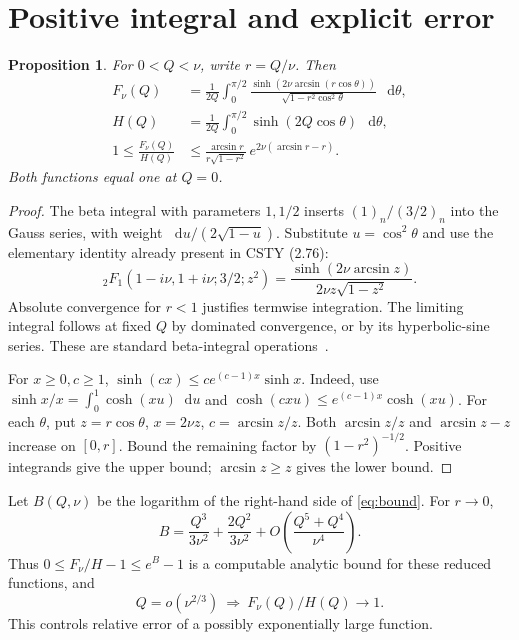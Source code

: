 \documentclass[11pt,a4paper]{article}
\newtheorem{proposition}{Proposition}
\newcommand{\dd}{\mathop{}\!\mathrm d}
\begin{document}
\section{Positive integral and explicit error}
\begin{proposition}
For \(0<Q<\nu\), write \(r=Q/\nu\). Then
\begin{align}
 F_\nu(Q)&=\frac1{2Q}\int_0^{\pi/2}
 \frac{\sinh(2\nu\arcsin(r\cos\theta))}
 {\sqrt{1-r^2\cos^2\theta}}\,\dd\theta, \label{eq:int}\\
 H(Q)&=\frac1{2Q}\int_0^{\pi/2}\sinh(2Q\cos\theta)\,\dd\theta,\\
 1\le\frac{F_\nu(Q)}{H(Q)}
 &\le \frac{\arcsin r}{r\sqrt{1-r^2}}\,
 e^{2\nu(\arcsin r-r)}. \label{eq:bound}
\end{align}
Both functions equal one at \(Q=0\).
\end{proposition}
\begin{proof}
The beta integral with parameters \(1,1/2\) inserts
\((1)_n/(3/2)_n\) into the Gauss series, with weight
\(\dd u/(2\sqrt{1-u})\). Substitute \(u=\cos^2\theta\) and use the
elementary identity already present in CSTY (2.76):
\[
 {}_2F_1(1-i\nu,1+i\nu;3/2;z^2)
 =\frac{\sinh(2\nu\arcsin z)}{2\nu z\sqrt{1-z^2}}.
\]
Absolute convergence for \(r<1\) justifies termwise integration.
The limiting integral follows at fixed \(Q\) by dominated convergence,
or by its hyperbolic-sine series. These are standard beta-integral
operations~\cite{DLMF}.

For \(x\ge0,c\ge1\), \(\sinh(cx)\le c e^{(c-1)x}\sinh x\).
Indeed, use \(\sinh x/x=\int_0^1\cosh(xu)\dd u\) and
\(\cosh(cxu)\le e^{(c-1)x}\cosh(xu)\).
For each \(\theta\), put \(z=r\cos\theta\), \(x=2\nu z\),
\(c=\arcsin z/z\). Both \(\arcsin z/z\) and \(\arcsin z-z\)
increase on \([0,r]\). Bound the remaining factor by
\((1-r^2)^{-1/2}\). Positive integrands give the upper bound;
\(\arcsin z\ge z\) gives the lower bound.
\end{proof}
Let \(B(Q,\nu)\) be the logarithm of the right-hand side of
\eqref{eq:bound}. For \(r\to0\),
\begin{equation}
 B=\frac{Q^3}{3\nu^2}+\frac{2Q^2}{3\nu^2}
   +O\left(\frac{Q^5+Q^4}{\nu^4}\right).
\end{equation}
Thus \(0\le F_\nu/H-1\le e^B-1\) is a computable analytic bound
for these reduced functions, and
\begin{equation}
 Q=o(\nu^{2/3})\ \Longrightarrow\ F_\nu(Q)/H(Q)\to1.
 \label{eq:window}
\end{equation}
This controls relative error of a possibly exponentially large function.
\end{document}
